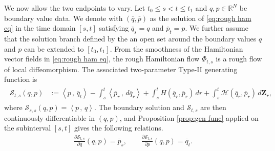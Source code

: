 \documentclass[11pt, oneside]{article}
\numberwithin{equation}{section}
\theoremstyle{definition}
\newcommand{\ob}[1]{\overline{#1}}
\newcommand{\wt}[1]{\widetilde{#1}}
\newcommand{\mc}[1]{\mathcal{#1}}
\newcommand{\mcal}[1]{\mc{#1}}
\newcommand{\scp}[2]{{\left\langle {#1}\, , \, {#2}\right\rangle}}
\def\p{{\partial}}
\def\p{\partial}
\begin{document}
We now allow the two endpoints to vary. Let $t_0\leq s<t\leq t_1$ and $q,p\in\mathbb{R}^N$ be boundary value data. We denote with $(\ob{q},\ob{p})$ as the solution of \eqref{eq:rough ham eq} in the time domain $[s,t]$ satisfying $\ob{q}_s=q$ and $\ob{p}_t=p$. We further assume that the solution branch defined by the an open set around the boundary values $q$ and $p$ can be extended to $[t_0, t_1]$. From the smoothness of the Hamiltonian vector fields in \eqref{eq:rough ham eq}, the rough Hamiltonian flow $\Phi_{t,s}$ is a rough flow of local diffeomorphism.
The associated two-parameter Type-II generating function is
\begin{align}
\begin{split}
    \mcal S_{t,s}(q,p)
    &:={\scp{p}{\ob{q}_t}}
       -\int_s^t\scp{\ob{p}_r}{d\ob{q}_r}
       +\int_s^t H(\ob{q}_r,\ob{p}_r)\,dr 
       +\int_s^t\mcal H(\ob{q}_r,\ob{p}_r)\,d\mathbf{Z}_r,
       \label{eq:two parameter generating function}
\end{split}
\end{align}
where $\mcal S_{s,s}(q,p) = \scp{p}{q}$. The boundary solution and $\mcal S_{t,s}$ are then continuously differentiable in $(q,p)$, and Proposition \ref{prop:gen func} applied on the subinterval $[s,t]$ gives the following relations.
\begin{align}
    \frac{\p\mcal S_{t,s}}{\p q}(q,p)=\ob{p}_s,
    \qquad
    \frac{\p\mcal S_{t,s}}{\p p}(q,p)=\ob{q}_t.
    \label{eq:two parameter Type II relations}
\end{align}
\end{document}
